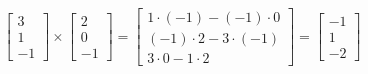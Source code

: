 \begin{equation}
    \begin{bmatrix}
        3 \\
        1 \\
        -1
    \end{bmatrix} \times
    \begin{bmatrix}
        2 \\
        0 \\
        -1
    \end{bmatrix} =
    \begin{bmatrix}
        1 \cdot (-1) - (-1) \cdot 0 \\
        (-1) \cdot 2 - 3 \cdot (-1) \\
        3 \cdot 0 - 1 \cdot 2
    \end{bmatrix} =
    \begin{bmatrix}
        -1 \\
        1 \\
        -2
    \end{bmatrix}
\end{equation}
